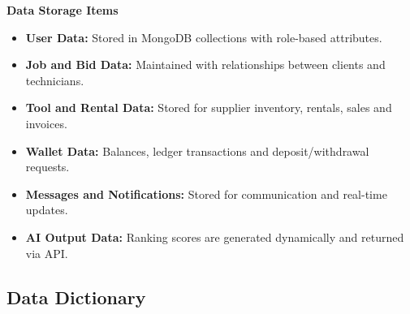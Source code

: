 \documentclass[A4paper,12pt]{report}
\theoremstyle{plain}
\theoremstyle{definition}
\theoremstyle{remark}
\numberwithin{equation}{section}
\begin{document}
\textbf{Data Storage Items}

\begin{itemize}
    \item \textbf{User Data:} Stored in MongoDB collections with role-based attributes.
    \item \textbf{Job and Bid Data:} Maintained with relationships between clients and technicians.
        \item \textbf{Tool and Rental Data:} Stored for supplier inventory, rentals, sales and invoices.
    \item \textbf{Wallet Data:} Balances, ledger transactions and deposit/withdrawal requests.
    \item \textbf{Messages and Notifications:} Stored for communication and real-time updates.
    \item \textbf{AI Output Data:} Ranking scores are generated dynamically and returned via API.
\end{itemize}


\subsection{Data Dictionary}
\end{document}
